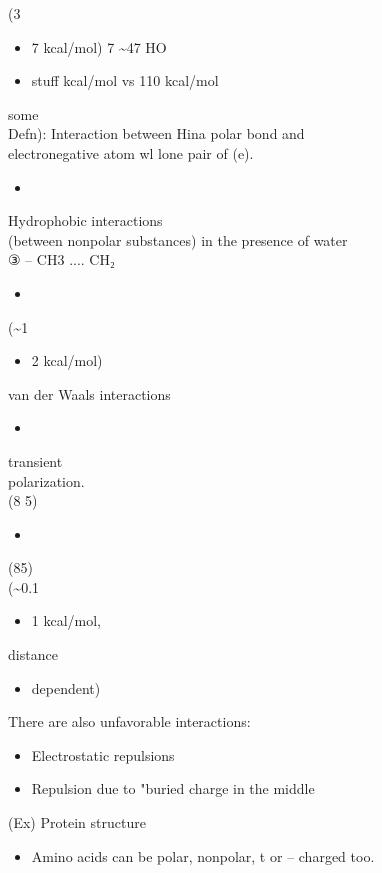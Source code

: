 \documentclass{article}
\begin{document}
(3\begin{itemize}\item 7 kcal/mol)
7 \textasciitilde47 HO\item  stuff
kcal/mol vs 110 kcal/mol
\end{itemize}
some\\
Defn): Interaction between Hina polar bond and\\
electronegative atom wl lone pair of (e).\\
\begin{itemize}\item 
\end{itemize}
Hydrophobic interactions\\
(between nonpolar substances) in the presence of water\\
③ – CH3 .... CH₂ \begin{itemize}\item 
\end{itemize}
(\textasciitilde1\begin{itemize}\item 2 kcal/mol)
\end{itemize}
van der Waals interactions \begin{itemize}\item 
\end{itemize}
transient\\
polarization.\\
(8 5) \begin{itemize}\item 
\end{itemize}
(85)\\
(\textasciitilde0.1\begin{itemize}\item 1 kcal/mol,
\end{itemize}
distance\begin{itemize}\item dependent)
\end{itemize}
There are also unfavorable interactions:\\
\begin{itemize}\item  Electrostatic repulsions
\item  Repulsion due to "buried charge in the middle
\end{itemize}
(Ex) Protein structure\\
\begin{itemize}\item  Amino acids can be polar, nonpolar, t or – charged too.
\end{itemize}
\end{document}
